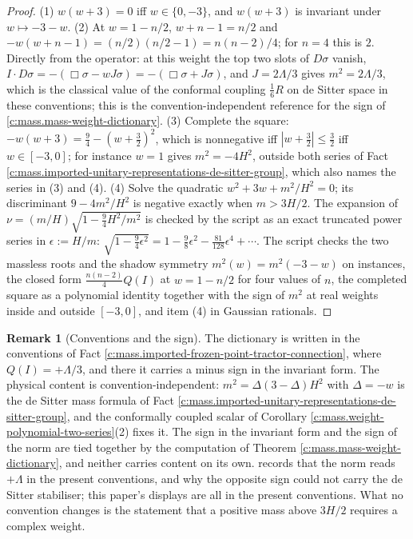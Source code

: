\documentclass[11pt]{article}
\theoremstyle{definition}
\newtheorem{remark}[theorem]{Remark}
\theoremstyle{plain}
\newcommand{\changedmark}[2]{\marginpar{\raggedright\scriptsize\color{#1}#2}}
\begin{document}
\begin{proof}
(1) $w(w+3) = 0$ iff $w \in \{0,-3\}$, and $w(w+3)$ is invariant under $w \mapsto -3-w$. (2) At $w = 1 - n/2$, $w + n - 1 = n/2$ and $-w(w+n-1) = (n/2)(n/2 - 1) = n(n-2)/4$; for $n = 4$ this is $2$. Directly from the operator: at this weight the top two slots of $D\sigma$ vanish, $I \cdot D\sigma = -(\Box\sigma - wJ\sigma) = -(\Box\sigma + J\sigma)$, and $J = 2\Lambda/3$ gives $m^{2} = 2\Lambda/3$, which is the classical value of the conformal coupling $\tfrac16 R$ on de Sitter space in these conventions; this is the convention-independent reference for the sign of \ref{c:mass.mass-weight-dictionary}. (3) Complete the square: $-w(w+3) = \tfrac94 - (w+\tfrac32)^{2}$, which is nonnegative iff $|w + \tfrac32| \le \tfrac32$ iff $w \in [-3,0]$; for instance $w = 1$ gives $m^{2} = -4H^{2}$, outside both series of Fact \ref{c:mass.imported-unitary-representations-de-sitter-group}, which also names the series in (3) and (4). (4) Solve the quadratic $w^{2} + 3w + m^{2}/H^{2} = 0$; its discriminant $9 - 4m^{2}/H^{2}$ is negative exactly when $m > 3H/2$. The expansion of $\nu = (m/H)\sqrt{1 - \tfrac94 H^{2}/m^{2}}$ is checked by the script as an exact truncated power series in $\epsilon := H/m$: $\sqrt{1 - \tfrac94\epsilon^{2}} = 1 - \tfrac98\epsilon^{2} - \tfrac{81}{128}\epsilon^{4} + \cdots$. The script checks the two massless roots and the shadow symmetry $m^{2}(w) = m^{2}(-3-w)$ on instances, the closed form $\tfrac{n(n-2)}{4}Q(I)$ at $w = 1 - n/2$ for four values of $n$, the completed square as a polynomial identity together with the sign of $m^{2}$ at real weights inside and outside $[-3,0]$, and item (4) in Gaussian rationals.

\end{proof}

\begin{remark}[Conventions and the sign]\label{c:note.mass.conventions-sign}
\changedmark{gray}{reworded}
The dictionary is written in the conventions of Fact \ref{c:mass.imported-frozen-point-tractor-connection}, where $Q(I) = +\Lambda/3$, and there it carries a minus sign in the invariant form. The physical content is convention-independent: $m^{2} = \Delta(3-\Delta)H^{2}$ with $\Delta = -w$ is the de Sitter mass formula of Fact \ref{c:mass.imported-unitary-representations-de-sitter-group}, and the conformally coupled scalar of Corollary \ref{c:mass.weight-polynomial-two-series}(2) fixes it. The sign in the invariant form and the sign of the norm are tied together by the computation of Theorem \ref{c:mass.mass-weight-dictionary}, and neither carries content on its own. \cite[Rem.~4.9]{ButlerT6} records that the norm reads $+\Lambda$ in the present conventions, and why the opposite sign could not carry the de Sitter stabiliser; this paper's displays are all in the present conventions. What no convention changes is the statement that a positive mass above $3H/2$ requires a complex weight.
\end{remark}
\end{document}

